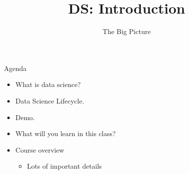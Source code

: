 \documentclass[aspectratio=169]{../latex_main/tntbeamer}  %
\title[Introduction]{DS: Introduction}
\subtitle{The Big Picture}
\begin{document}
	
	\maketitle


	\begin{frame}[c]{Agenda}
		
		\begin{itemize}
		    \item What is data science?
		    \item Data Science Lifecycle.
		    \item Demo.
		    \item What will you learn in this class?
		    \item Course overview
		    \begin{itemize}
		        \item Lots of important details
		    \end{itemize}
		\end{itemize}
		
	\end{frame}
	
	
	
	
\end{document}
